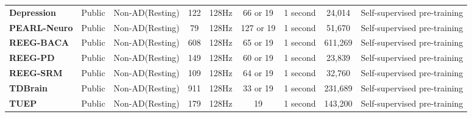 \begin{table*}[t]
{\begin{tabular}{@{}ll|cccccccc@{}}
    \midrule

    \multicolumn{2}{l|}{\textbf{Depression}} & Public &  Non-AD(Resting)  & 122 &  128Hz  & 66 or 19 & 1 second &  24,014  &  Self-supervised pre-training \\
    \multicolumn{2}{l|}{\textbf{PEARL-Neuro}} & Public &  Non-AD(Resting)  & 79 &  128Hz  & 127 or 19 & 1 second &  51,670  &  Self-supervised pre-training \\
    \multicolumn{2}{l|}{\textbf{REEG-BACA}} & Public &  Non-AD(Resting)  & 608 &  128Hz  & 65 or 19 & 1 second &  611,269  &  Self-supervised pre-training \\
    \multicolumn{2}{l|}{\textbf{REEG-PD}} & Public &  Non-AD(Resting)  & 149 &  128Hz  & 60 or 19 & 1 second &  23,839  &  Self-supervised pre-training \\
    \multicolumn{2}{l|}{\textbf{REEG-SRM}} & Public &  Non-AD(Resting)  & 109 &  128Hz  & 64 or 19 & 1 second &  32,760  &  Self-supervised pre-training \\
    \multicolumn{2}{l|}{\textbf{TDBrain}} & Public &  Non-AD(Resting)  & 911 &  128Hz  & 33 or 19 & 1 second &  231,689  &  Self-supervised pre-training \\
    \multicolumn{2}{l|}{\textbf{TUEP}} & Public &  Non-AD(Resting)  & 179 &  128Hz  & 19 & 1 second &  143,200  &  Self-supervised pre-training \\
    
    \bottomrule
    \end{tabular}
    } %
\vspace{-5mm}
\end{table*}
